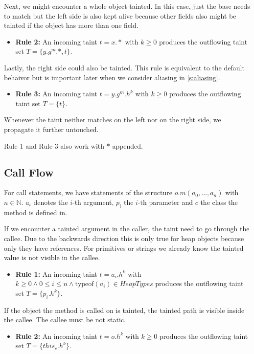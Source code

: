 \documentclass[../draft.tex]{subfiles}
\begin{document}
    Next, we might encounter a whole object tainted. In this case, just the base needs to match but the left side is also kept alive because other fields also might be tainted if the object has more than one field.
    \begin{itemize}
        \item[] \textbf{Rule 2:} An incoming taint $t = x.*$ with $k \geq 0$ produces the outflowing taint set $T = \{y.g^m.*, t\}$.
    \end{itemize} 

    Lastly, the right side could also be tainted. This rule is equivalent to the default behaivor but is important later when we consider aliasing in \autoref{s:aliasing}.
    \begin{itemize}
        \item[] \textbf{Rule 3:} An incoming taint $t = y.g^m.h^k$ with $k \geq 0$ produces the outflowing taint set $T = \{t\}$.
    \end{itemize}


    Whenever the taint neither matches on the left nor on the right side, we propagate it further untouched.

    Rule 1 and Rule 3 also work with $*$ appended.

    \subsection{Call Flow}
    For call statements, we have statements of the structure $o.m(a_0, ..., a_n)$ with $n \in \mathbb{N}$. $a_i$ denotes the $i$-th argument, $p_i$ the $i$-th parameter and $c$ the class the method is defined in.

    If we encounter a tainted argument in the caller, the taint need to go through the callee. Due to the backwards direction this is only true for heap objects because only they have references. For primitives or strings we already know the tainted value is not visible in the callee.
    \begin{itemize}
        \item[] \textbf{Rule 1:} An incoming taint $t = a_i.h^k$ with $k \geq 0 \land 0 \leq i \leq n \land \text{typeof}(a_i) \in \mathit{HeapTypes}$ produces the outflowing taint set $T = \{p_i.h^k\}$.
    \end{itemize}

    If the object the method is called on is tainted, the tainted path is visible inside the callee. The callee must be not static.
    \begin{itemize}
        \item[] \textbf{Rule 2:} An incoming taint $t = o.h^k$ with $k \geq 0$ produces the outflowing taint set $T = \{\mathit{this}_c.h^k\}$. 
    \end{itemize}
    
\end{document}
